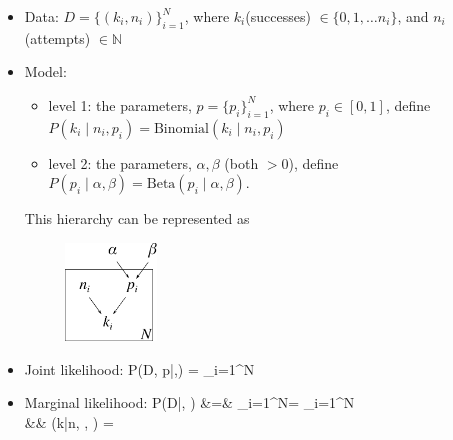 \begin{itemize}
	\item Data: $D = \{(k_i, n_i)\}_{i=1}^N$, where $k_i$(successes) $\in\{0, 1, \ldots n_i\}$, and $n_i$(attempts) $\in \mathds{N}$

	\item Model: 
		\begin{itemize}
			\item level 1: the parameters, $p = \{p_i\}_{i=1}^N$, where $p_i \in [0,1]$, define $P(k_i\;|\;n_i, p_i) = \text{Binomial}(k_i\;|\;n_i, p_i)$
			\item level 2: the parameters, $\alpha, \beta$ (both $>0$), define $P(p_i\;|\;\alpha, \beta) = \text{Beta}(p_i\;|\;\alpha, \beta)$.
		\end{itemize}
		This hierarchy can be represented as
		\begin{figure}[h!]
		\centering
			\includegraphics[height=26mm]{./figs/04-BetaBinomial.pdf}
		\end{figure}

	\item Joint likelihood:
	\be
		P(D, p\;|\;\alpha,\beta) = \prod_{i=1}^N
	\ee

	\item Marginal likelihood:
	\ba
		P(D\;|\;\alpha, \beta) &=& \prod_{i=1}^N = \prod_{i=1}^N
		\\
		&&
		(k\;|\;n, \alpha, \beta) =   
	\ea
\end{itemize}

